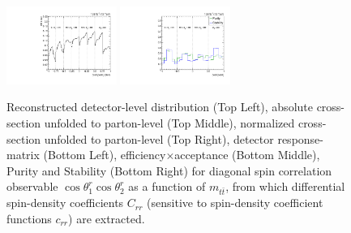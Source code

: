 \begin{figure}[htb]
\begin{center}
 \includegraphics[width=0.32\textwidth]{fig_fullRun2UL/unfolding/combined/TotEff_c_rr_mttbar.pdf}
 \includegraphics[width=0.32\textwidth]{fig_fullRun2UL/unfolding/combined/PurStab_c_rr_mttbar.pdf} \\
\caption{Reconstructed detector-level distribution (Top Left), absolute cross-section unfolded to parton-level (Top Middle), normalized cross-section unfolded to parton-level (Top Right), detector response-matrix (Bottom Left), efficiency$\times$acceptance (Bottom Middle), Purity and Stability (Bottom Right) for diagonal spin correlation observable $\cos\theta_{1}^{r}\cos\theta_{2}^{r}$ as a function of $m_{t\bar{t}}$, from which differential spin-density coefficients $C_{rr}$ (sensitive to spin-density coefficient functions $c_{r r}$) are extracted.}
\label{fig:c_rr_mttbar}
\end{center}
\end{figure}
\clearpage
